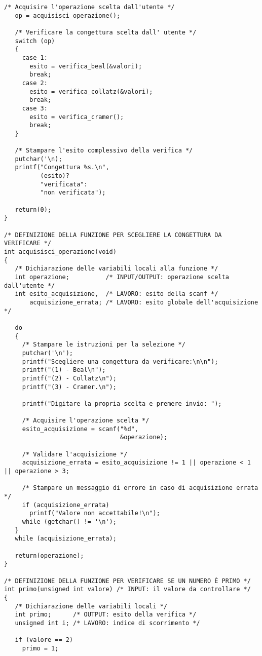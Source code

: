 \documentclass[10pt]{report}
\begin{document}
\begin{lstlisting}[label = {lst:codiceSorgente}]
   /* Acquisire l'operazione scelta dall'utente */
   op = acquisisci_operazione();
       
   /* Verificare la congettura scelta dall' utente */
   switch (op)
   {   
     case 1:
       esito = verifica_beal(&valori);
       break;  
     case 2:
       esito = verifica_collatz(&valori);
       break;     
     case 3:
       esito = verifica_cramer();
       break;
   }
   
   /* Stampare l'esito complessivo della verifica */
   putchar('\n);
   printf("Congettura %s.\n", 
          (esito)? 
   	      "verificata": 
   	      "non verificata"); 

   return(0);
}

/* DEFINIZIONE DELLA FUNZIONE PER SCEGLIERE LA CONGETTURA DA VERIFICARE */
int acquisisci_operazione(void)
{
   /* Dichiarazione delle variabili locali alla funzione */
   int operazione;          /* INPUT/OUTPUT: operazione scelta dall'utente */
   int esito_acquisizione,  /* LAVORO: esito della scanf */
       acquisizione_errata; /* LAVORO: esito globale dell'acquisizione */  
	   
   do
   {
     /* Stampare le istruzioni per la selezione */
     putchar('\n');
     printf("Scegliere una congettura da verificare:\n\n");
     printf("(1) - Beal\n");
     printf("(2) - Collatz\n");
     printf("(3) - Cramer.\n");

     printf("Digitare la propria scelta e premere invio: ");

   	 /* Acquisire l'operazione scelta */
   	 esito_acquisizione = scanf("%d",
   	                            &operazione);

   	 /* Validare l'acquisizione */
   	 acquisizione_errata = esito_acquisizione != 1 || operazione < 1 || operazione > 3; 

   	 /* Stampare un messaggio di errore in caso di acquisizione errata */
   	 if (acquisizione_errata)
   	   printf("Valore non accettabile!\n");
   	 while (getchar() != '\n'); 
   } 
   while (acquisizione_errata);   

   return(operazione);
}

/* DEFINIZIONE DELLA FUNZIONE PER VERIFICARE SE UN NUMERO È PRIMO */
int primo(unsigned int valore) /* INPUT: il valore da controllare */
{   
   /* Dichiarazione delle variabili locali */
   int primo;      /* OUTPUT: esito della verifica */
   unsigned int i; /* LAVORO: indice di scorrimento */ 
   
   if (valore == 2)
     primo = 1;


\end{lstlisting}
\end{document}
